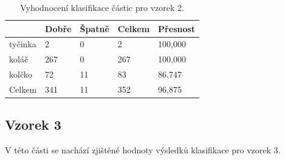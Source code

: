 \documentclass[11pt,twoside,a4paper,table]{book}
\begin{document}
\begin{table}[h]
\begin{center}
\begin{tabular}{lllll}
\rowcolor[HTML]{9B9B9B} 
\multicolumn{1}{|l|}{\cellcolor[HTML]{9B9B9B}Třída} & \multicolumn{1}{l|}{\cellcolor[HTML]{9B9B9B}Dobře} & \multicolumn{1}{l|}{\cellcolor[HTML]{9B9B9B}Špatně}  & \multicolumn{1}{l|}{\cellcolor[HTML]{9B9B9B}Celkem} & \multicolumn{1}{l|}{\cellcolor[HTML]{9B9B9B}Přesnost} \\ \hline
\multicolumn{1}{|l|}{tyčinka}                              & \multicolumn{1}{l|}{2}                             & \multicolumn{1}{l|}{0}                               & \multicolumn{1}{l|}{2}                              & \multicolumn{1}{l|}{100,000}                          \\ \hline
\multicolumn{1}{|l|}{koláč}                              & \multicolumn{1}{l|}{267}                           & \multicolumn{1}{l|}{0}                               & \multicolumn{1}{l|}{267}                            & \multicolumn{1}{l|}{100,000}                          \\ \hline
\multicolumn{1}{|l|}{kolčko}                              & \multicolumn{1}{l|}{72}                            & \multicolumn{1}{l|}{11}                              & \multicolumn{1}{l|}{83}                             & \multicolumn{1}{l|}{86,747}                           \\ \hline
\multicolumn{1}{|l|}{Celkem}                        & \multicolumn{1}{l|}{341}                           & \multicolumn{1}{l|}{11}                              & \multicolumn{1}{l|}{352}                            & \multicolumn{1}{l|}{96,875}                           \\ \hline
\end{tabular}
\end{center}
\caption{Vyhodnocení klasifikace částic pro vzorek 2.}
\label{tab:classresult2}
\end{table}

\newpage
\FloatBarrier
\subsection{Vzorek 3}
V této části se nachází zjištěné hodnoty výsledků klasifikace pro vzorek 3.
\end{document}

